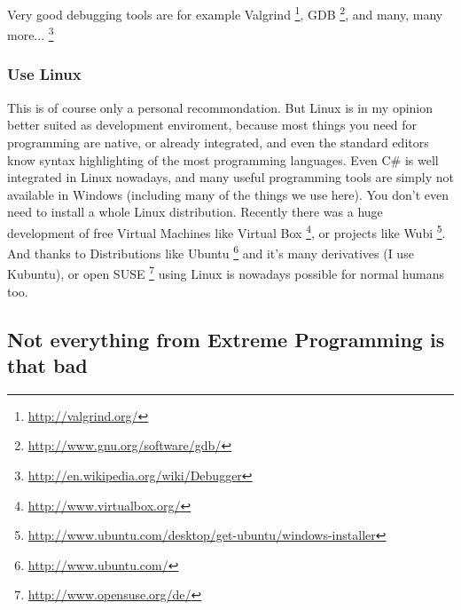 \documentclass[letterpaper,10pt,english]{manual}
\begin{document}
Very good debugging tools are for example Valgrind \footnote{
\href{http://valgrind.org/}{http://valgrind.org/}
}, GDB \footnote{
\href{http://www.gnu.org/software/gdb/}{http://www.gnu.org/software/gdb/}
},
and many, many more... \footnote{
\href{http://en.wikipedia.org/wiki/Debugger}{http://en.wikipedia.org/wiki/Debugger}
}


\subsubsection{Use Linux}

This is of course only a personal recommondation. But Linux is in my opinion better
suited as development enviroment, because most things you need for programming are native, or
already integrated, and even the standard editors know syntax highlighting of the most programming
languages. Even C\# is well integrated in Linux nowadays, and many useful programming tools are simply not
available in Windows (including many of the things we use here).
You don't even need to install a whole Linux distribution. Recently there was a huge development of free
Virtual Machines like Virtual Box \footnote{
\href{http://www.virtualbox.org/}{http://www.virtualbox.org/}
}, or projects like Wubi \footnote{
\href{http://www.ubuntu.com/desktop/get-ubuntu/windows-installer}{http://www.ubuntu.com/desktop/get-ubuntu/windows-installer}
}. And thanks to Distributions like
Ubuntu \footnote{
\href{http://www.ubuntu.com/}{http://www.ubuntu.com/}
}  and it's many derivatives (I use Kubuntu), or open SUSE \footnote{
\href{http://www.opensuse.org/de/}{http://www.opensuse.org/de/}
} using Linux is nowadays possible for
normal humans too.


\subsection{Not everything from Extreme Programming is that bad}
\end{document}
